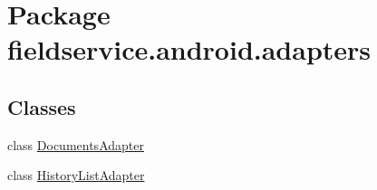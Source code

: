 \hypertarget{namespacefieldservice_1_1android_1_1adapters}{\section{Package fieldservice.\+android.\+adapters}
\label{namespacefieldservice_1_1android_1_1adapters}
}
\subsection*{Classes}
\begin{DoxyCompactItemize}
\item 
class \hyperlink{classfieldservice_1_1android_1_1adapters_1_1_documents_adapter}{Documents\+Adapter}
\item 
class \hyperlink{classfieldservice_1_1android_1_1adapters_1_1_history_list_adapter}{History\+List\+Adapter}
\end{DoxyCompactItemize}

